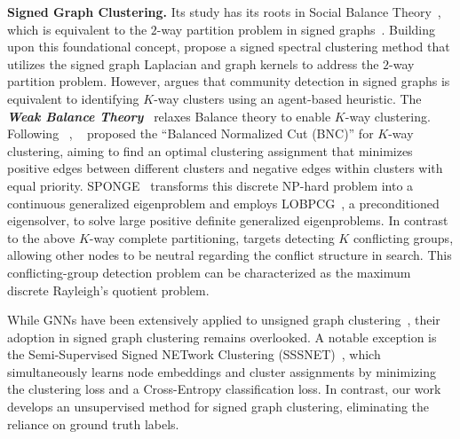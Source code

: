 \textbf{Signed Graph Clustering.}
Its study has its roots in Social Balance Theory~\cite{cartwright1956structural}, which is equivalent to the $2$-way partition problem in signed graphs~\cite{Mercado2016clustering}. 
Building upon this foundational concept, \cite{kunegis2010spectral} propose a signed spectral clustering method that utilizes the signed graph Laplacian and graph kernels to address the $2$-way partition problem.  However, \cite{yang2007community} argues that community detection in signed graphs is equivalent to identifying $K$-way clusters using an agent-based heuristic. The \textbf{\textit{Weak Balance Theory}}~\cite{davis1967clustering} relaxes Balance theory to enable $K$-way clustering. Following ~\cite{kunegis2010spectral}, ~\cite{chiang2012scalable} proposed the ``Balanced Normalized Cut (BNC)'' for $K$-way clustering, aiming to find an optimal clustering assignment that minimizes positive edges between different clusters and negative edges within clusters with equal priority. SPONGE~\cite{cucuringu2019sponge} transforms this discrete NP-hard problem into a continuous generalized eigenproblem and employs LOBPCG~\cite{knyazev2001toward}, a preconditioned eigensolver, to solve large positive definite generalized eigenproblems. In contrast to the above $K$-way complete partitioning, \cite{tzeng2020discovering} targets detecting $K$ conflicting groups, allowing other nodes to be neutral regarding the conflict structure in search. This conflicting-group detection problem can be characterized as the maximum discrete Rayleigh's quotient problem.

While GNNs have been extensively applied to unsigned graph clustering~\cite{PanHLJYZ18,wang2019attributed,LiuTZLSYZ22,bo2020structural,tu2021deep}, their adoption in signed graph clustering remains overlooked. A notable exception is the Semi-Supervised Signed NETwork Clustering (SSSNET)~\cite{he2022sssnet}, which simultaneously learns node embeddings and cluster assignments by minimizing the clustering loss and a Cross-Entropy classification loss. In contrast, our work develops an unsupervised method for signed graph clustering, eliminating the reliance on ground truth labels.